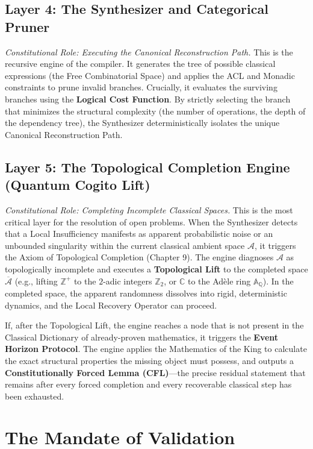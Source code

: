 \documentclass[12pt,openany]{extbook}
\theoremstyle{plain}
\theoremstyle{definition}
\begin{document}
\subsection*{Layer 4: The Synthesizer and Categorical Pruner}
\emph{Constitutional Role: Executing the Canonical Reconstruction Path.}
This is the recursive engine of the compiler. It generates the tree of possible classical expressions (the Free Combinatorial Space) and applies the ACL and Monadic constraints to prune invalid branches. Crucially, it evaluates the surviving branches using the \textbf{Logical Cost Function}. By strictly selecting the branch that minimizes the structural complexity (the number of operations, the depth of the dependency tree), the Synthesizer deterministically isolates the unique Canonical Reconstruction Path.

\subsection*{Layer 5: The Topological Completion Engine (Quantum Cogito Lift)}
\emph{Constitutional Role: Completing Incomplete Classical Spaces.}
This is the most critical layer for the resolution of open problems. When the Synthesizer detects that a Local Insufficiency manifests as apparent probabilistic noise or an unbounded singularity within the current classical ambient space $\mathcal{A}$, it triggers the Axiom of Topological Completion (Chapter 9). The engine diagnoses $\mathcal{A}$ as topologically incomplete and executes a \textbf{Topological Lift} to the completed space $\overline{\mathcal{A}}$ (e.g., lifting $\mathbb{Z}^+$ to the $2$-adic integers $\mathbb{Z}_2$, or $\mathbb{C}$ to the Ad\`ele ring $\mathbb{A}_{\mathbb{Q}}$). In the completed space, the apparent randomness dissolves into rigid, deterministic dynamics, and the Local Recovery Operator can proceed.

If, after the Topological Lift, the engine reaches a node that is not present in the Classical Dictionary of already-proven mathematics, it triggers the \textbf{Event Horizon Protocol}. The engine applies the Mathematics of the King to calculate the exact structural properties the missing object must possess, and outputs a \textbf{Constitutionally Forced Lemma (CFL)}---the precise residual statement that remains after every forced completion and every recoverable classical step has been exhausted.

\section{The Mandate of Validation}
\end{document}
